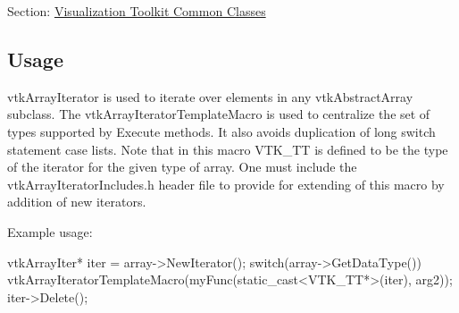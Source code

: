Section\-: \hyperlink{sec_vtkcommon}{Visualization Toolkit Common Classes} \hypertarget{vtkwidgets_vtkxyplotwidget_Usage}{}\subsection{Usage}\label{vtkwidgets_vtkxyplotwidget_Usage}
vtk\-Array\-Iterator is used to iterate over elements in any vtk\-Abstract\-Array subclass. The vtk\-Array\-Iterator\-Template\-Macro is used to centralize the set of types supported by Execute methods. It also avoids duplication of long switch statement case lists. Note that in this macro V\-T\-K\-\_\-\-T\-T is defined to be the type of the iterator for the given type of array. One must include the vtk\-Array\-Iterator\-Includes.\-h header file to provide for extending of this macro by addition of new iterators.

Example usage\-: \begin{DoxyVerb} vtkArrayIter* iter = array->NewIterator();
 switch(array->GetDataType())
   {
   vtkArrayIteratorTemplateMacro(myFunc(static_cast<VTK_TT*>(iter), arg2));
   }
 iter->Delete();
\end{DoxyVerb}



